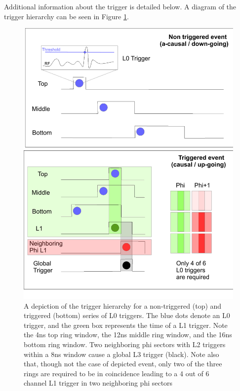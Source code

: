 		Additional information about the trigger is detailed below.  A diagram of the trigger hierarchy can be seen in Figure \ref{fig:trigPattern}.
		
\begin{figure}
	\centering
	\includegraphics[height=0.8\textheight]{figures/triggerHeirarchy}
	\caption{A depiction of the trigger hierarchy for a non-triggered (top) and triggered (bottom) series of L0 triggers.  The blue dots denote an L0 trigger, and the green box represents the time of a L1  trigger.  Note the 4ns top ring window, the 12ns middle ring window, and the 16ns bottom ring window.  Two neighboring phi sectors with L2 triggers within a 8ns window cause a global L3 trigger (black).  Note also that, though not the case of depicted event, only two of the three rings are required to be in coincidence leading to a 4 out of 6 channel L1 trigger in two neighboring phi sectors}
	\label{fig:trigPattern}
\end{figure}


